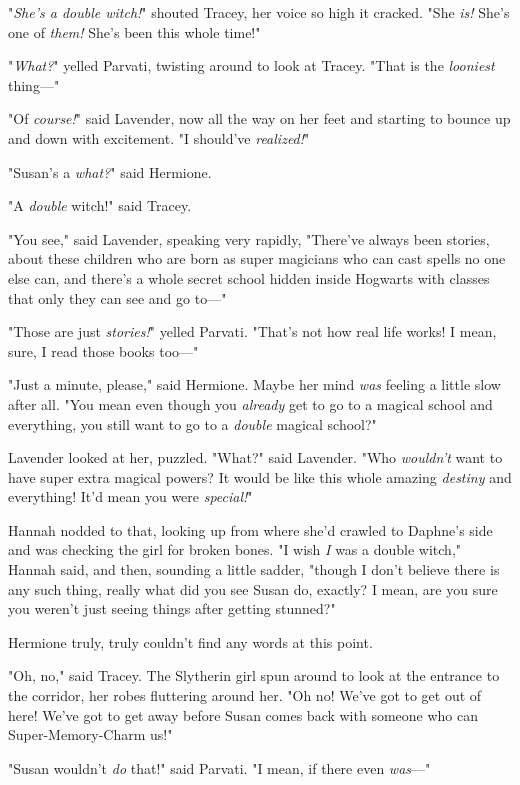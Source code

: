 "\emph{She's a double witch!}" shouted Tracey, her voice so high it cracked.
"She \emph{is!} She's one of \emph{them!} She's been this whole time!"

"\emph{What?}" yelled Parvati, twisting around to look at Tracey. "That is the
\emph{looniest} thing—"

"Of \emph{course!}" said Lavender, now all the way on her feet and starting to
bounce up and down with excitement. "I should've \emph{realized!}"

"Susan's a \emph{what?}" said Hermione.

"A \emph{double} witch!" said Tracey.

"You see," said Lavender, speaking very rapidly, "There've always been stories,
about these children who are born as super magicians who can cast spells no one
else can, and there's a whole secret school hidden inside Hogwarts with classes
that only they can see and go to—"

"Those are just \emph{stories!}" yelled Parvati. "That's not how real life
works! I mean, sure, I read those books too—"

"Just a minute, please," said Hermione. Maybe her mind \emph{was} feeling a
little slow after all. "You mean even though you \emph{already} get to go to a
magical school and everything, you still want to go to a \emph{double} magical
school?"

Lavender looked at her, puzzled. "What?" said Lavender. "Who \emph{wouldn't}
want to have super extra magical powers? It would be like this whole amazing
\emph{destiny} and everything! It'd mean you were \emph{special!}"

Hannah nodded to that, looking up from where she'd crawled to Daphne's side and
was checking the girl for broken bones. "I wish \emph{I} was a double witch,"
Hannah said, and then, sounding a little sadder, "though I don't believe there
is any such thing, really{\el} what did you see Susan do, exactly? I mean,
are you sure you weren't just seeing things after getting stunned?"

Hermione truly, truly couldn't find any words at this point.

"Oh, no," said Tracey. The Slytherin girl spun around to look at the entrance
to the corridor, her robes fluttering around her. "Oh no! We've got to get out
of here! We've got to get away before Susan comes back with someone who can
Super-Memory-Charm us!"

"Susan wouldn't \emph{do} that!" said Parvati. "I mean, if there even
\emph{was}—"

